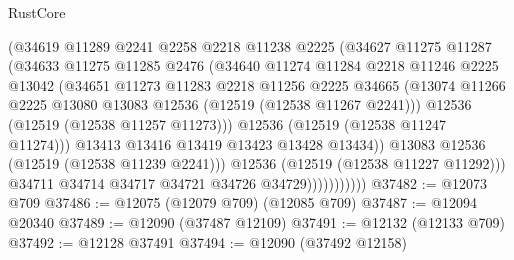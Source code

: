 \begin{lexlean}{RustCore}
\begin{coremodule}
                            (@34619
                              @11289
                              @2241
                              @2258
                              @2218
                              @11238
                              @2225
                              (@34627
                                @11275
                                @11287
                                (@34633
                                  @11275
                                  @11285
                                  @2476
                                  (@34640
                                    @11274
                                    @11284
                                    @2218
                                    @11246
                                    @2225
                                    @13042
                                    (@34651
                                      @11273
                                      @11283
                                      @2218
                                      @11256
                                      @2225
                                      @34665
                                      (@13074
                                        @11266
                                        @2225
                                        @13080
                                        @13083
                                        @12536
                                        (@12519 (@12538 @11267 @2241)))
                                      @12536
                                      (@12519 (@12538 @11257 @11273)))
                                    @12536
                                    (@12519 (@12538 @11247 @11274)))
                                  @13413
                                  @13416
                                  @13419
                                  @13423
                                  @13428
                                  @13434))
                              @13083
                              @12536
                              (@12519 (@12538 @11239 @2241)))
                            @12536
                            (@12519 (@12538 @11227 @11292)))
                          @34711
                          @34714
                          @34717
                          @34721
                          @34726
                          @34729)))))))))))
@37482 := @12073 @709
@37486 := @12075 (@12079 @709) (@12085 @709)
@37487 := @12094 @20340
@37489 := @12090 (@37487 @12109)
@37491 := @12132 (@12133 @709)
@37492 := @12128 @37491
@37494 := @12090 (@37492 @12158)

\end{coremodule}
\end{lexlean}
